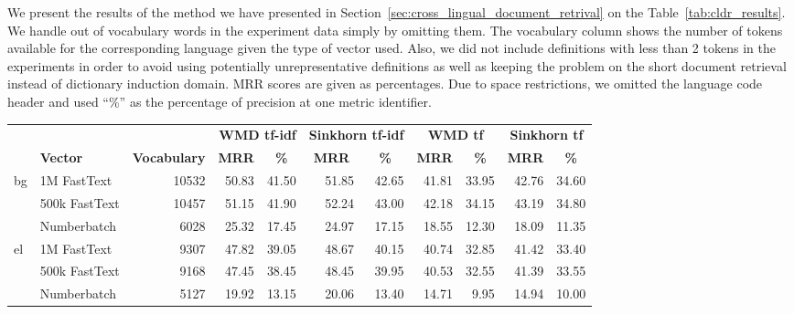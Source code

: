 We present the results of the method we have presented in Section~\ref{sec:cross_lingual_document_retrival} on the Table~\ref{tab:cldr_results}.
We handle out of vocabulary words in the experiment data simply by omitting them.
The vocabulary column shows the number of tokens available for the corresponding language given the type of vector used.
Also, we did not include definitions with less than 2 tokens in the experiments in order to avoid using potentially unrepresentative definitions as well as keeping the problem on the short document retrieval instead of dictionary induction domain.
MRR scores are given as percentages.
Due to space restrictions, we omitted the language code header and used \enquote{\%} as the percentage of precision at one metric identifier.

\begin{landscape}
    \begin{table}[htbp]
        \centering
        \begin{tabular}{llr|rr|rr|rr|rr}
            \toprule
 &  &  & \multicolumn{2}{r}{\textbf{WMD tf-idf}} & \multicolumn{2}{r}{\textbf{Sinkhorn tf-idf}} & \multicolumn{2}{c}{\textbf{WMD tf}} & \multicolumn{2}{c}{\textbf{Sinkhorn tf}} \\ \cline{4-11}
 & \textbf{Vector} & \textbf{Vocabulary} & \multicolumn{1}{c}{\textbf{MRR}} & \multicolumn{1}{c}{\textbf{\%}} & \multicolumn{1}{c}{\textbf{MRR}} & \multicolumn{1}{c}{\textbf{\%}} & \multicolumn{1}{c}{\textbf{MRR}} & \multicolumn{1}{c}{\textbf{\%}} & \multicolumn{1}{c}{\textbf{MRR}} & \multicolumn{1}{c}{\textbf{\%}} \\ \cline{2-11}
            \multirow{3}{*}{bg} & 1M FastText & 10532 & 50.83 & 41.50 & 51.85 & 42.65 & 41.81 & 33.95 & 42.76 & 34.60 \\
                                & 500k FastText & 10457 & 51.15 & 41.90 & 52.24 & 43.00 & 42.18 & 34.15 & 43.19 & 34.80 \\
                                & Numberbatch & 6028 & 25.32 & 17.45 & 24.97 & 17.15 & 18.55 & 12.30 & 18.09 & 11.35 \\ \cmidrule(lr){2-11}
            \multirow{3}{*}{el} & 1M FastText & 9307 & 47.82 & 39.05 & 48.67 & 40.15 & 40.74 & 32.85 & 41.42 & 33.40 \\
                                & 500k FastText & 9168 & 47.45 & 38.45 & 48.45 & 39.95 & 40.53 & 32.55 & 41.39 & 33.55 \\
                                & Numberbatch & 5127 & 19.92 & 13.15 & 20.06 & 13.40 & 14.71 & 9.95 & 14.94 & 10.00 \\ \cmidrule(lr){2-11}

\end{tabular}
\end{table}
\end{landscape}
